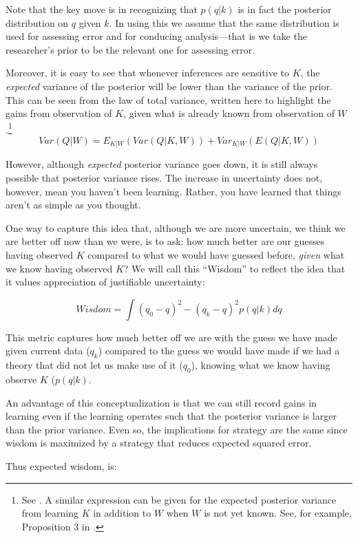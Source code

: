 \documentclass[
  12pt,
]{book}
\begin{document}
Note that the key move is in recognizing that \(p(q |k)\) is in fact the posterior distribution on \(q\) given \(k\). In using this we assume that the same distribution is used for assessing error and for conducing analysis---that is we take the researcher's prior to be the relevant one for assessing error.

Moreover, it is easy to see that whenever inferences are sensitive to \(K\), the \emph{expected} variance of the posterior will be lower than the variance of the prior. This can be seen from the law of total variance, written here to highlight the gains from observation of \(K\), given what is already known from observation of \(W\).\footnote{See \citet{raiffa1961applied}. A similar expression can be given for the expected posterior variance from learning \(K\) in addition to \(W\) when \(W\) is not yet known. See, for example, Proposition 3 in \citet{geweke2014analysis}.}\\
\[Var(Q|W) = E_{K|W}(Var(Q|K,W)) +Var_{K|W}(E(Q|K,W))\]

However, although \emph{expected} posterior variance goes down, it is still always possible that posterior variance rises. The increase in uncertainty does not, however, mean you haven't been learning. Rather, you have learned that things aren't as simple as you thought.

One way to capture this idea that, although we are more uncertain, we think we are better off now than we were, is to ask: how much better are our guesses having observed \(K\) compared to what we would have guessed before, \emph{given} what we know having observed \(K\)? We will call this ``Wisdom'' to reflect the idea that it values appreciation of justifiable uncertainty:

\[Wisdom  = \int(q_0 - q)^2 - (q_k - q)^2 p(q | k)dq\]

This metric captures how much better off we are with the guess we have made given current data (\(q_k\)) compared to the guess we would have made if we had a theory that did not let us make use of it (\(q_0\)), knowing what we know having observe \(K\) (\(p(q|k)\).

An advantage of this conceptualization is that we can still record gains in learning even if the learning operates such that the posterior variance is larger than the prior variance. Even so, the implications for strategy are the same since wisdom is maximized by a strategy that reduces expected squared error.

Thus expected wisdom, is:
\end{document}
